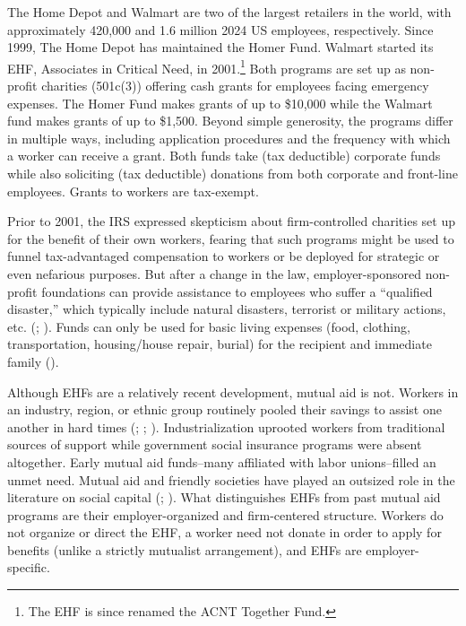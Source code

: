 \documentclass[
  11pt,
  oneside]{article}
\begin{document}
The Home Depot and Walmart are two of the largest retailers in the world, with approximately 420,000 and 1.6 million 2024 US employees, respectively. Since 1999, The Home Depot has maintained the Homer Fund. Walmart started its EHF, Associates in Critical Need, in 2001.\footnote{The EHF is since renamed the ACNT Together Fund.} Both programs are set up as non-profit charities (501c(3)) offering cash grants for employees facing emergency expenses. The Homer Fund makes grants of up to \$10,000 while the Walmart fund makes grants of up to \$1,500. Beyond simple generosity, the programs differ in multiple ways, including application procedures and the frequency with which a worker can receive a grant. Both funds take (tax deductible) corporate funds while also soliciting (tax deductible) donations from both corporate and front-line employees. Grants to workers are tax-exempt.

Prior to 2001, the IRS expressed skepticism about firm-controlled charities set up for the benefit of their own workers, fearing that such programs might be used to funnel tax-advantaged compensation to workers or be deployed for strategic or even nefarious purposes. But after a change in the law, employer-sponsored non-profit foundations can provide assistance to employees who suffer a ``qualified disaster,'' which typically include natural disasters, terrorist or military actions, etc. (; ). Funds can only be used for basic living expenses (food, clothing, transportation, housing/house repair, burial) for the recipient and immediate family ().

Although EHFs are a relatively recent development, mutual aid is not. Workers in an industry, region, or ethnic group routinely pooled their savings to assist one another in hard times (; ; ). Industrialization uprooted workers from traditional sources of support while government social insurance programs were absent altogether. Early mutual aid funds--many affiliated with labor unions--filled an unmet need. Mutual aid and friendly societies have played an outsized role in the literature on social capital (; ). What distinguishes EHFs from past mutual aid programs are their employer-organized and firm-centered structure. Workers do not organize or direct the EHF, a worker need not donate in order to apply for benefits (unlike a strictly mutualist arrangement), and EHFs are employer-specific.
\end{document}
